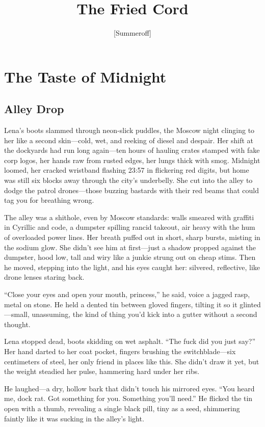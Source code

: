 \documentclass[12pt]{book}
\title{The Fried Cord}
\author{[Summeroff]}
\date{}
\begin{document}
\maketitle
\tableofcontents

\chapter{The Taste of Midnight}
\section{Alley Drop}

Lena's boots slammed through neon-slick puddles, the Moscow night clinging to her like a second skin---cold, wet, and reeking of diesel and despair. Her shift at the dockyards had run long again---ten hours of hauling crates stamped with fake corp logos, her hands raw from rusted edges, her lungs thick with smog. Midnight loomed, her cracked wristband flashing 23:57 in flickering red digits, but home was still six blocks away through the city's underbelly. She cut into the alley to dodge the patrol drones---those buzzing bastards with their red beams that could tag you for breathing wrong.

The alley was a shithole, even by Moscow standards: walls smeared with graffiti in Cyrillic and code, a dumpster spilling rancid takeout, air heavy with the hum of overloaded power lines. Her breath puffed out in short, sharp bursts, misting in the sodium glow. She didn't see him at first---just a shadow propped against the dumpster, hood low, tall and wiry like a junkie strung out on cheap stims. Then he moved, stepping into the light, and his eyes caught her: silvered, reflective, like drone lenses staring back.

``Close your eyes and open your mouth, princess,'' he said, voice a jagged rasp, metal on stone. He held a dented tin between gloved fingers, tilting it so it glinted---small, unassuming, the kind of thing you'd kick into a gutter without a second thought.

Lena stopped dead, boots skidding on wet asphalt. ``The fuck did you just say?'' Her hand darted to her coat pocket, fingers brushing the switchblade---six centimeters of steel, her only friend in places like this. She didn't draw it yet, but the weight steadied her pulse, hammering hard under her ribs.

He laughed---a dry, hollow bark that didn't touch his mirrored eyes. ``You heard me, dock rat. Got something for you. Something you'll need.'' He flicked the tin open with a thumb, revealing a single black pill, tiny as a seed, shimmering faintly like it was sucking in the alley's light.
\end{document}
